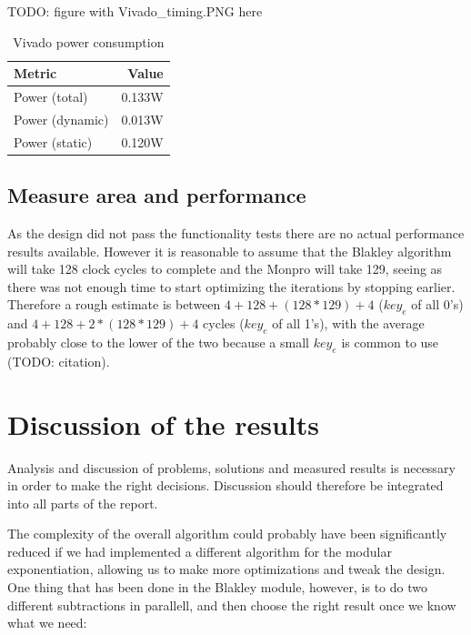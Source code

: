 TODO: figure with Vivado\_timing.PNG here

\begin{table}[H]
    \centering
    \begin{tabular}{l|r}
        Metric & Value \\ \hline
        Power (total) & 0.133W\\
        Power (dynamic) & 0.013W \\
        Power (static) & 0.120W \\
    \end{tabular}
    \caption{Vivado power consumption}
    \label{tab:vivado_synth_results}
\end{table}
\subsection{Measure area and performance}
As the design did not pass the functionality tests there are no actual performance results available. However it is reasonable to assume that the Blakley algorithm will take 128 clock cycles to complete and the Monpro will take 129, seeing as there was not enough time to start optimizing the iterations by stopping earlier.\\
Therefore a rough estimate is between $4+128+(128*129)+4$ ($key_e$ of all 0's) and $4+128+2*(128*129)+4$ cycles ($key_e$ of all 1's), with the average probably close to the lower of the two because a small $key_e$ is common to use (TODO: citation).


\section{Discussion of the results}
 
Analysis and discussion of problems, solutions and measured results is necessary in order to make the right decisions. Discussion should therefore be integrated into all parts of the report. 

The complexity of the overall algorithm could probably have been significantly reduced if we had implemented a different algorithm for the modular exponentiation, allowing us to make more optimizations and tweak the design. \\
One thing that has been done in the Blakley module, however, is to do two different subtractions in parallell, and then choose the right result once we know what we need:

\inputminted[firstline=74,lastline=78]{VHDL}{../Project/VHDL/RSA_module.srcs/sources_1/new/blakley.vhd}

